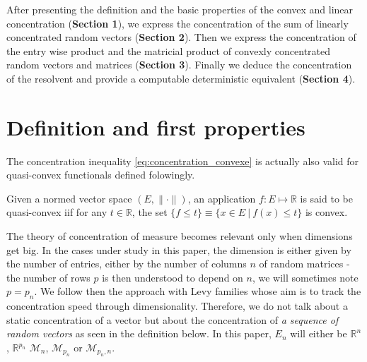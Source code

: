 \documentclass{ws-rmta}
\begin{document}
After presenting the definition and the basic properties of the convex and linear concentration (\textbf{Section 1}), we express the concentration of the sum of linearly concentrated random vectors (\textbf{Section 2}). Then we express the concentration of the entry wise product and the matricial product of convexly concentrated random vectors and matrices (\textbf{Section 3}). Finally we deduce the concentration of the resolvent and provide a computable deterministic equivalent (\textbf{Section 4}).



\section{Definition and first properties}

The concentration inequality \eqref{eq:concentration_convexe} is actually also valid for quasi-convex functionals defined folowingly.
\begin{definition}\label{def:quasi_convexe}
  Given a normed vector space $(E,\|\cdot \|)$, an application $f : E \mapsto \mathbb R$ is said to be quasi-convex iif for any $t \in \mathbb R$, the set $\{f \leq t\} \equiv \{x \in E \ | \ f(x) \leq t\}$ is convex.
\end{definition}
The theory of concentration of measure becomes relevant only when dimensions get big. In the cases under study in this paper, the dimension is either given by the number of entries, either by the number of columns $n$ of random matrices - the number of rows $p$ is then understood to depend on $n$, we will sometimes note $p = p_n $. 
We follow then the approach with Levy families \cite{Le51} whose aim is to track the concentration speed through dimensionality. Therefore, we do not talk about a static concentration of a vector but about the concentration of \emph{a sequence of random vectors} as seen in the definition below. In this paper, $E_n$ will either be $\mathbb R^{n}$, $\mathbb R^{p_n}$ $\mathcal{M}_{n}$, $\mathcal{M}_{p_n}$ or $\mathcal{M}_{p_n,n}$. 
\end{document}
